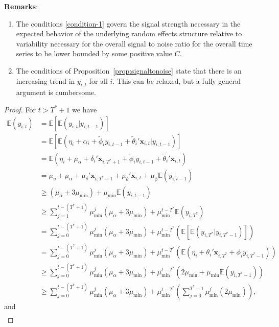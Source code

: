 \documentclass[11pt]{article}
\newcommand{\x}{\textbf{x}}
\def\E{\mathbb{E}} %
\theoremstyle{definition}
\begin{document}
\textbf{Remarks}:
\begin{enumerate}
	\item The conditions \eqref{condition-1} govern the signal strength necessary in the expected behavior of the underlying random effects structure relative to variability necessary for the overall signal to noise ratio for the overall time series to be lower bounded by some positive value $C$.
	\item The conditions of Proposition~\ref{prop:signaltonoise} state that there is an increasing trend in $y_{i,t}$ for all $i$. This can be relaxed, but a fully general argument is cumbersome.
\end{enumerate}



\begin{proof}
For $t > T^* + 1$ we have 
\begin{align*}
  \E(y_{i,t}) &= \E\left[\E(y_{i,t}|y_{i,t-1})\right] \\ 
    &= \E\left[\E(\eta_i + \alpha_i + \tilde\phi_i y_{i,t-1} 
      + \tilde\theta_i'\x_{i,t}|y_{i,t-1})\right] \\
    &= \E(\eta_i + \mu_\alpha + \delta_i'\x_{i,T^*+1} + \tilde\phi_i y_{i,t-1} + \tilde\theta_i'\x_{i,t}) \\
    &= \mu_\eta + \mu_\alpha + \mu_\delta'\x_{i,T^*+1} + \mu_{\tilde\theta}'\x_{i,t} + \mu_{\tilde\phi}\E(y_{i,t-1}) \\
    &\geq (\mu_\alpha + 3\mu_{\min}) + \mu_{\min}\E(y_{i,t-1}) \\
    &\geq \sum_{j=1}^{t - (T^* + 1)} \mu_{\min}^j(\mu_{\alpha} + 3\mu_{\min}) + \mu_{\min}^{t-T^*}\E(y_{i,T^*}) \\
    &= \sum_{j=0}^{t - (T^* + 1)} \mu_{\min}^j(\mu_{\alpha} + 3\mu_{\min}) + \mu_{\min}^{t-T^*}\left(\E\left[\E(y_{i,T^*}|y_{i,T^*-1})\right]\right) \\   
    &= \sum_{j=0}^{t - (T^* + 1)} \mu_{\min}^j(\mu_{\alpha} + 3\mu_{\min}) + \mu_{\min}^{t-T^*}\left(\E(\eta_i + \theta_i'\x_{i,T^*} + \phi_i y_{i,T^*-1}) \right) \\
    &\geq \sum_{j=0}^{t - (T^* + 1)} \mu_{\min}^j(\mu_{\alpha} + 3\mu_{\min}) + \mu_{\min}^{t-T^*}\left(2\mu_{\min} + \mu_{\min} \E(y_{i,T^*-1}) \right) \\
    &\geq \sum_{j=0}^{t - (T^* + 1)} \mu_{\min}^j(\mu_{\alpha} + 3\mu_{\min}) + \mu_{\min}^{t-T^*}\left(\sum_{j=0}^{T^*-1}\mu_{\min}^j(2\mu_{\min}) \right), 
\end{align*}
and 
\begin{align*}

\end{align*}
\end{proof}
\end{document}
